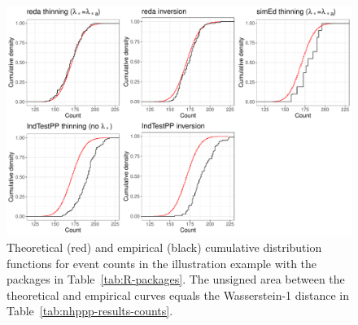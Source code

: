 \documentclass[article]{jss}\usepackage[]{graphicx}\usepackage[]{xcolor}
\makeatletter
\def\maxwidth{ %
  \ifdim\Gin@nat@width>\linewidth
    \linewidth
  \else
    \Gin@nat@width
  \fi
}
\newenvironment{knitrout}{}{} %
\makeatother
\begin{document}
\begin{knitrout}
\color{fgcolor}\begin{figure}
\includegraphics[width=\maxwidth]{figure/r-pkgs-pkg-counts-1} \caption{Theoretical (red) and empirical (black) cumulative distribution functions for event counts in the illustration example with the  packages in Table~\ref{tab:R-packages}. The unsigned area between the theoretical and empirical curves equals the Wasserstein-1 distance in Table~\ref{tab:nhppp-results-counts}.}\label{fig:r-pkgs-pkg-counts}
\end{figure}

\end{knitrout}
\end{document}
